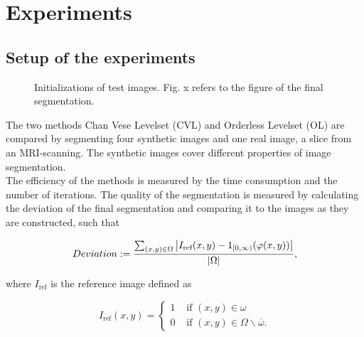 
\chapter{Experiments}\label{chapter:experiments}
\section{Setup of the experiments}\label{section:setupex}
\begin{figure}[h]
  \centering
  \caption{Initializations of test images. Fig. x refers to the figure of the final segmentation.}
\end{figure}

The two methods Chan Vese Levelset (CVL) and Orderless Levelset (OL) are compared by segmenting four synthetic images and one real image, a slice from an MRI-scanning. The synthetic images cover different properties of image segmentation.\\
The efficiency of the methods is measured by the time consumption and the number of iterations. The quality of the segmentation is measured by calculating the deviation of the final segmentation and comparing it to the images as they are constructed, such that 

\begin{equation}
  Deviation := \frac{\sum_{(x,y)\in\Omega}\left| {I_{\text{ref}}(x,y)-1_{[0,\infty)}(\varphi(x,y))} \right|}{\left| {\Omega} \right|},
\end{equation}

where $I_{\text{ref}}$ is the reference image defined as

\begin{equation}
  I_{\text{ref}}(x,y) = \begin{cases}
    1 & \mbox{ if } (x,y)\in \omega\\
    0 & \mbox{ if } (x,y)\in \Omega\backslash\overline{\omega}.
  \end{cases}
\end{equation}

